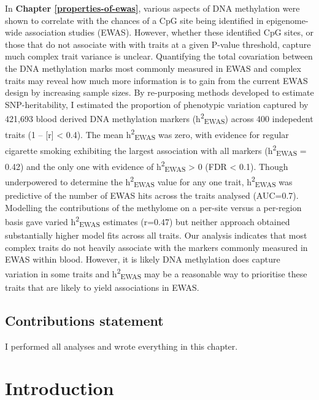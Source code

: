 \documentclass[11pt,oneside]{bristolthesis}
\begin{document}
In \textbf{Chapter \ref{properties-of-ewas}}, various aspects of DNA methylation were shown to correlate with the chances of a CpG site being identified in epigenome-wide association studies (EWAS). However, whether these identified CpG sites, or those that do not associate with with traits at a given P-value threshold, capture much complex trait variance is unclear. Quantifying the total covariation between the DNA methylation marks most commonly measured in EWAS and complex traits may reveal how much more information is to gain from the current EWAS design by increasing sample sizes. By re-purposing methods developed to estimate SNP-heritability, I estimated the proportion of phenotypic variation captured by 421,693 blood derived DNA methylation markers (h\textsuperscript{2}\textsubscript{EWAS}) across 400 indepedent traits (1 -- {[}r{]} \textless{} 0.4). The mean h\textsuperscript{2}\textsubscript{EWAS} was zero, with evidence for regular cigarette smoking exhibiting the largest association with all markers (h\textsuperscript{2}\textsubscript{EWAS} = 0.42) and the only one with evidence of h\textsuperscript{2}\textsubscript{EWAS} \textgreater{} 0 (FDR \textless{} 0.1). Though underpowered to determine the h\textsuperscript{2}\textsubscript{EWAS} value for any one trait, h\textsuperscript{2}\textsubscript{EWAS} was predictive of the number of EWAS hits across the traits analysed (AUC=0.7). Modelling the contributions of the methylome on a per-site versus a per-region basis gave varied h\textsuperscript{2}\textsubscript{EWAS} estimates (r=0.47) but neither approach obtained substantially higher model fits across all traits. Our analysis indicates that most complex traits do not heavily associate with the markers commonly measured in EWAS within blood. However, it is likely DNA methylation does capture variation in some traits and h\textsuperscript{2}\textsubscript{EWAS} may be a reasonable way to prioritise these traits that are likely to yield associations in EWAS.

\hypertarget{contributions-statement-05}{%
\subsection{Contributions statement}\label{contributions-statement-05}}

I performed all analyses and wrote everything in this chapter.

\hypertarget{introduction-05}{%
\section{Introduction}\label{introduction-05}}
\end{document}
